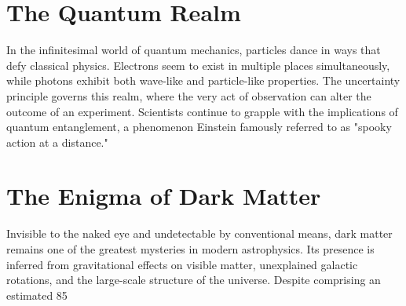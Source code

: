 \documentclass[12pt]{article}
\begin{document}
\thispagestyle{fancy}
\pagestyle{fancy}

\section{The Quantum Realm}
In the infinitesimal world of quantum mechanics, particles dance in ways that defy classical physics. Electrons seem to exist in multiple places simultaneously, while photons exhibit both wave-like and particle-like properties. The uncertainty principle governs this realm, where the very act of observation can alter the outcome of an experiment. Scientists continue to grapple with the implications of quantum entanglement, a phenomenon Einstein famously referred to as "spooky action at a distance."

\section{The Enigma of Dark Matter}
Invisible to the naked eye and undetectable by conventional means, dark matter remains one of the greatest mysteries in modern astrophysics. Its presence is inferred from gravitational effects on visible matter, unexplained galactic rotations, and the large-scale structure of the universe. Despite comprising an estimated 85%
\end{document}
